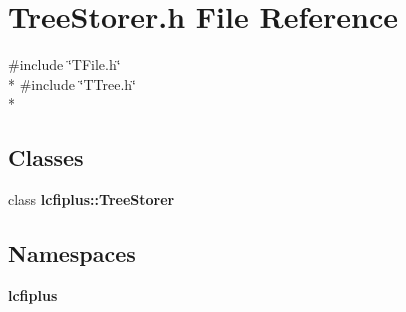 \section{Tree\-Storer.\-h File Reference}
\label{TreeStorer_8h}
{\ttfamily \#include \char`\"{}T\-File.\-h\char`\"{}}\\*
{\ttfamily \#include \char`\"{}T\-Tree.\-h\char`\"{}}\\*
\subsection*{Classes}
\begin{DoxyCompactItemize}
\item 
class {\bf lcfiplus\-::\-Tree\-Storer}
\end{DoxyCompactItemize}
\subsection*{Namespaces}
\begin{DoxyCompactItemize}
\item 
{\bf lcfiplus}
\end{DoxyCompactItemize}
